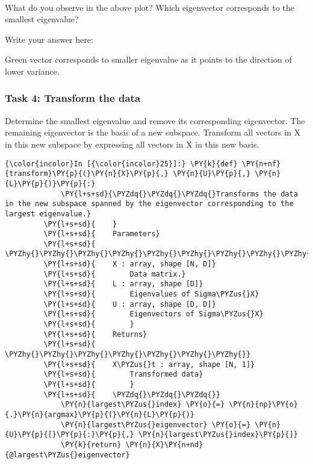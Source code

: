     \begin{center}
    \end{center}
    { \hspace*{\fill} \\}
    
    What do you observe in the above plot? Which eigenvector corresponds to
the smallest eigenvalue?

Write your answer here:

Green vector corresponds to smaller eigenvalue as it points to the
direction of lower variance.

    \hypertarget{task-4-transform-the-data}{%
\subsubsection{Task 4: Transform the
data}\label{task-4-transform-the-data}}

    Determine the smallest eigenvalue and remove its corresponding
eigenvector. The remaining eigenvector is the basis of a new subspace.
Transform all vectors in X in this new subspace by expressing all
vectors in X in this new basis.

    \begin{Verbatim}[commandchars=\\\{\}]
{\color{incolor}In [{\color{incolor}25}]:} \PY{k}{def} \PY{n+nf}{transform}\PY{p}{(}\PY{n}{X}\PY{p}{,} \PY{n}{U}\PY{p}{,} \PY{n}{L}\PY{p}{)}\PY{p}{:}
             \PY{l+s+sd}{\PYZdq{}\PYZdq{}\PYZdq{}Transforms the data in the new subspace spanned by the eigenvector corresponding to the largest eigenvalue.}
         \PY{l+s+sd}{    }
         \PY{l+s+sd}{    Parameters}
         \PY{l+s+sd}{    \PYZhy{}\PYZhy{}\PYZhy{}\PYZhy{}\PYZhy{}\PYZhy{}\PYZhy{}\PYZhy{}\PYZhy{}\PYZhy{}}
         \PY{l+s+sd}{    X : array, shape [N, D]}
         \PY{l+s+sd}{        Data matrix.}
         \PY{l+s+sd}{    L : array, shape [D]}
         \PY{l+s+sd}{        Eigenvalues of Sigma\PYZus{}X}
         \PY{l+s+sd}{    U : array, shape [D, D]}
         \PY{l+s+sd}{        Eigenvectors of Sigma\PYZus{}X}
         \PY{l+s+sd}{        }
         \PY{l+s+sd}{    Returns}
         \PY{l+s+sd}{    \PYZhy{}\PYZhy{}\PYZhy{}\PYZhy{}\PYZhy{}\PYZhy{}\PYZhy{}}
         \PY{l+s+sd}{    X\PYZus{}t : array, shape [N, 1]}
         \PY{l+s+sd}{        Transformed data}
         \PY{l+s+sd}{        }
         \PY{l+s+sd}{    \PYZdq{}\PYZdq{}\PYZdq{}}
             \PY{n}{largest\PYZus{}index} \PY{o}{=} \PY{n}{np}\PY{o}{.}\PY{n}{argmax}\PY{p}{(}\PY{n}{L}\PY{p}{)}
             \PY{n}{largest\PYZus{}eigenvector} \PY{o}{=} \PY{n}{U}\PY{p}{[}\PY{p}{:}\PY{p}{,} \PY{n}{largest\PYZus{}index}\PY{p}{]}
             \PY{k}{return} \PY{n}{X}\PY{n+nd}{@largest\PYZus{}eigenvector}
\end{Verbatim}

